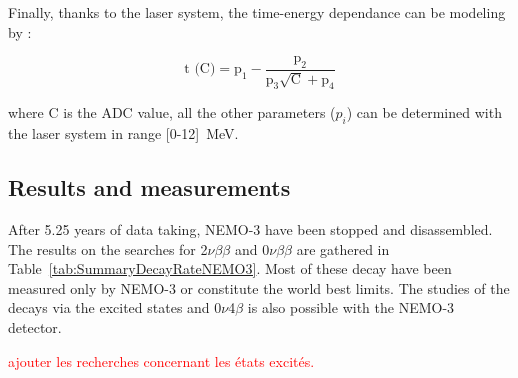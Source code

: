 \documentclass[main.tex]{subfiles}
\begin{document}
\bigskip    


\NI Finally, thanks to the laser system, the time-energy dependance can be modeling by :


\begin{equation}
\text{t (C)} = \text{p}_\text{1} - \frac{\text{p}_\text{2}}{\text{p}_\text{3} \sqrt{\text{C}} + \text{p}_4}
\end{equation} 


\NI where C is the ADC value, all the other parameters ($p_i$) can be determined with the laser system in range [0-12]~MeV.


\FloatBarrier

\subsection{Results and measurements}


\NI After 5.25 years of data taking, NEMO-3 have been stopped and disassembled. The results on the searches for 2$\nu\beta\beta$ and 0$\nu\beta\beta$ are gathered in Table~\ref{tab:SummaryDecayRateNEMO3}. Most of these decay have been measured only by NEMO-3 or constitute the world best limits. The studies of the decays via the excited states and 0$\nu$4$\beta$ is also possible with the NEMO-3 detector.


\NI \textcolor{red}{ajouter les recherches concernant les états excités.}
\end{document}

